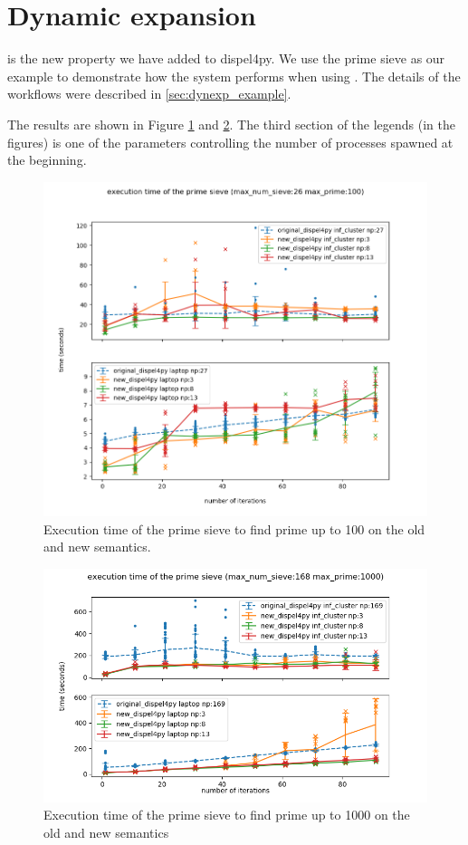 \section{Dynamic expansion}
\tDynexp is the new property we have added to dispel4py. We use the prime sieve as our example to demonstrate how the system performs when using \tdynexp. The details of the workflows were described in \ref{sec:dynexp_example}.

The results are shown in Figure \ref{fig:sieve_opt_100} and \ref{fig:sieve_opt_1000}. The third section of the legends (in the figures) is one of the parameters controlling the number of processes spawned at the beginning.

\begin{figure}[h]
\centering
    \includegraphics[width=1\textwidth]{figures/sieve_opt1_100}
\caption{Execution time of the prime sieve to find prime up to 100 on the old and new semantics.}
\label{fig:sieve_opt_100}
\end{figure}

\begin{figure}[h]
\centering
    \includegraphics[width=1\textwidth]{figures/sieve_opt1_1000}
\caption{Execution time of the prime sieve to find prime up to 1000 on the old and new semantics}
\label{fig:sieve_opt_1000}
\end{figure}

